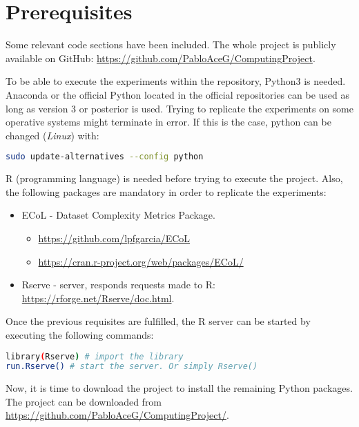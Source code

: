 \chapter{Prerequisites}\label{chp:prerequisites}

Some relevant code sections have been included. The whole project is publicly 
available on GitHub: \url{https://github.com/PabloAceG/ComputingProject}.


To be able to execute the experiments within the repository, Python3 is needed. 
Anaconda or the official Python located in the official repositories can be used 
as long as version 3 or posterior is used. Trying to replicate the experiments 
on some operative systems might terminate in error. If this is the case, python
can be changed (\textit{Linux}) with:

\begin{lstlisting}[language=bash]
    sudo update-alternatives --config python
\end{lstlisting}

R (programming language) is needed before trying to execute the project. Also, 
the following packages are mandatory in order to replicate the experiments:

\begin{itemize}
    \item ECoL - Dataset Complexity Metrics Package.
        \begin{itemize}
            \item \url{https://github.com/lpfgarcia/ECoL}
            \item \url{https://cran.r-project.org/web/packages/ECoL/}
        \end{itemize}
    \item Rserve - server, responds requests made to R: 
    \url{https://rforge.net/Rserve/doc.html}.
\end{itemize}

Once the previous requisites are fulfilled, the R server can be started by 
executing the following commands:

\begin{lstlisting}[language=bash]
library(Rserve) # import the library
run.Rserve() # start the server. Or simply Rserve()
\end{lstlisting}

Now, it is time to download the project to install the remaining Python 
packages. The project can be downloaded from 
\url{https://github.com/PabloAceG/ComputingProject/}.

